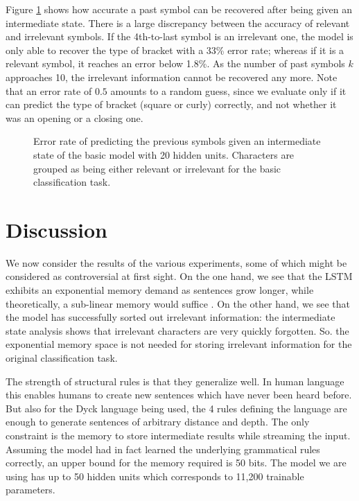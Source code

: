 \documentclass[11pt,a4paper]{article}
\newlength\figureheight
\newlength\figurewidth
\begin{document}
Figure \ref{fig:analysis_previous_results} shows how accurate a past symbol can be recovered after being given an intermediate state. There is a large discrepancy between the accuracy of relevant and irrelevant symbols. If the 4th-to-last symbol is an irrelevant one, the model is only able to recover the type of bracket with a 33\% error rate; whereas if it is a relevant symbol, it reaches an error below 1.8\%. As the number of past symbols $k$ approaches 10, the irrelevant information cannot be recovered any more. Note that an error rate of $0.5$ amounts to a random guess, since we evaluate only if it can predict the type of bracket (square or curly) correctly, and not whether it was an opening or a closing one.

\setlength\figureheight{4cm}
\setlength\figurewidth{\linewidth}
\begin{figure}[ht]
    \caption{Error rate of predicting the previous symbols given an intermediate state of the basic model with 20 hidden units. Characters are grouped as being either relevant or irrelevant for the basic classification task.}%
    \label{fig:analysis_previous_results}%
\end{figure}

\section{Discussion}

We now consider the results of the various experiments, some of which might be considered as controversial at first sight. On the one hand, we see that the LSTM exhibits an exponential memory demand as sentences grow longer, while theoretically, a sub-linear memory would suffice \cite{magniez2014recognizing}. On the other hand, we see that the model has successfully sorted out irrelevant information: the intermediate state analysis shows that irrelevant characters are very quickly forgotten. So. the exponential memory space is not needed for storing irrelevant information for the original classification task.

The strength of structural rules is that they generalize well. In human language this enables humans to create new sentences which have never been heard before. But also for the Dyck language being used, the 4 rules defining the language are enough to generate sentences of arbitrary distance and depth. The only constraint is the memory to store intermediate results while streaming the input. Assuming the model had in fact learned the underlying grammatical rules correctly, an upper bound for the memory required is 50 bits. The model we are using has up to 50 hidden units which corresponds to 11,200 trainable parameters. %
\end{document}
